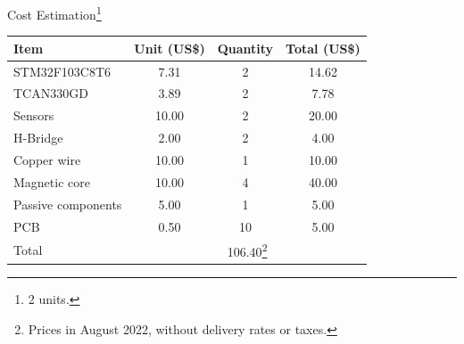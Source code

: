 \begin{frame}{Cost Estimation\footnote{2 units.}}

\begin{table}[!htb]\scriptsize
    \centering
    \label{tab:cost-estimation}
    \begin{tabular}{lccc}
        \toprule[1.5pt]
        \textbf{Item} & \textbf{Unit (US\$)} & \textbf{Quantity} & \textbf{Total (US\$)} \\
        \midrule
        STM32F103C8T6         & 7.31  & 2  & 14.62 \\
        TCAN330GD             & 3.89  & 2  & 7.78 \\
        Sensors               & 10.00 & 2  & 20.00 \\
        H-Bridge              & 2.00  & 2  & 4.00 \\
        Copper wire           & 10.00 & 1  & 10.00 \\
        Magnetic core         & 10.00 & 4  & 40.00 \\
        Passive components    & 5.00  & 1  & 5.00 \\
        PCB                   & 0.50  & 10 & 5.00 \\
        \midrule
        Total          & \multicolumn{3}{c}{106.40\footnote{Prices in August 2022, without delivery rates or taxes.}} \\
        \bottomrule[1.5pt]
    \end{tabular}
\end{table}

\end{frame}